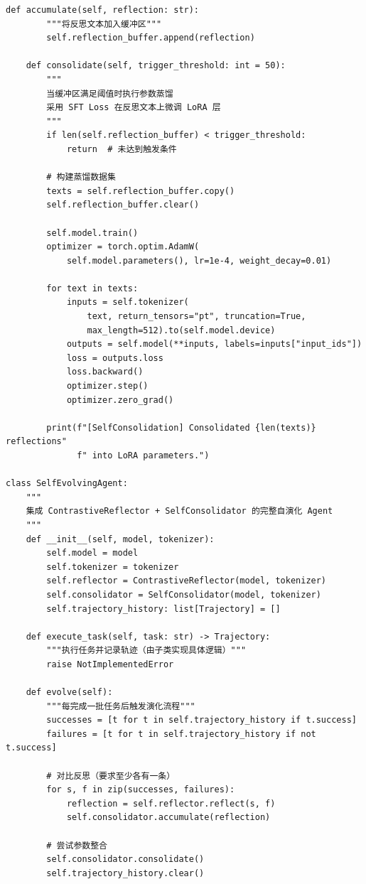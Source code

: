 \documentclass[11pt,a4paper]{article}
\begin{document}
\begin{lstlisting}[style=pythonstyle, caption={Self-Consolidation 核心框架}]
    def accumulate(self, reflection: str):
        """将反思文本加入缓冲区"""
        self.reflection_buffer.append(reflection)

    def consolidate(self, trigger_threshold: int = 50):
        """
        当缓冲区满足阈值时执行参数蒸馏
        采用 SFT Loss 在反思文本上微调 LoRA 层
        """
        if len(self.reflection_buffer) < trigger_threshold:
            return  # 未达到触发条件

        # 构建蒸馏数据集
        texts = self.reflection_buffer.copy()
        self.reflection_buffer.clear()

        self.model.train()
        optimizer = torch.optim.AdamW(
            self.model.parameters(), lr=1e-4, weight_decay=0.01)

        for text in texts:
            inputs = self.tokenizer(
                text, return_tensors="pt", truncation=True,
                max_length=512).to(self.model.device)
            outputs = self.model(**inputs, labels=inputs["input_ids"])
            loss = outputs.loss
            loss.backward()
            optimizer.step()
            optimizer.zero_grad()

        print(f"[SelfConsolidation] Consolidated {len(texts)} reflections"
              f" into LoRA parameters.")

class SelfEvolvingAgent:
    """
    集成 ContrastiveReflector + SelfConsolidator 的完整自演化 Agent
    """
    def __init__(self, model, tokenizer):
        self.model = model
        self.tokenizer = tokenizer
        self.reflector = ContrastiveReflector(model, tokenizer)
        self.consolidator = SelfConsolidator(model, tokenizer)
        self.trajectory_history: list[Trajectory] = []

    def execute_task(self, task: str) -> Trajectory:
        """执行任务并记录轨迹（由子类实现具体逻辑）"""
        raise NotImplementedError

    def evolve(self):
        """每完成一批任务后触发演化流程"""
        successes = [t for t in self.trajectory_history if t.success]
        failures = [t for t in self.trajectory_history if not t.success]

        # 对比反思（要求至少各有一条）
        for s, f in zip(successes, failures):
            reflection = self.reflector.reflect(s, f)
            self.consolidator.accumulate(reflection)

        # 尝试参数整合
        self.consolidator.consolidate()
        self.trajectory_history.clear()
\end{lstlisting}
\end{document}
